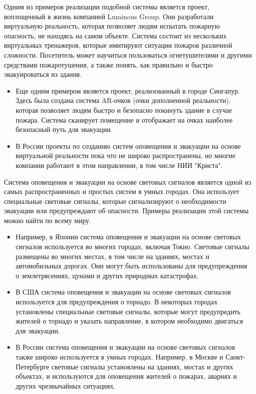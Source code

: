 \begin{multicols}{2}
Одним из примеров реализации подобной системы является проект,
воплощенный в жизнь компанией Luminous Group. Они разработали
виртуальную реальность, которая позволяет людям испытать пожарную
опасность, не находясь на самом объекте. Система состоит из нескольких
виртуальных тренажеров, которые имитируют ситуации пожаров различной
сложности. Посетитель может научиться пользоваться огнетушителями и
другими средствами пожаротушения, а также понять, как правильно и быстро
эвакуироваться из здания.

\begin{itemize}
\item
  Еще одним примером является проект, реализованный в городе Сингапур.
  Здесь была создана система AR-очков (очки дополненной реальности),
  которая позволяет людям быстро и безопасно покинуть здание в случае
  пожара. Система сканирует помещение и отображает на очках наиболее
  безопасный путь для эвакуации.
\item
  В России проекты по созданию систем оповещения и эвакуации на основе
  виртуальной реальности пока что не широко распространены, но многие
  компании работают в этом направлении, в том числе НИИ "Криста".
\end{itemize}

Система оповещения и эвакуации на основе световых сигналов является
одной из самых распространенных и простых систем в умных городах. Она
использует специальные световые сигналы, которые сигнализируют о
необходимости эвакуации или предупреждают об опасности. Примеры
реализации этой системы можно найти по всему миру.

\begin{itemize}
\item
  Например, в Японии система оповещения и эвакуации на основе световых
  сигналов используется во многих городах, включая Токио. Световые
  сигналы размещены во многих местах, в том числе на зданиях, мостах и
  автомобильных дорогах. Они могут быть использованы для предупреждения
  о землетрясениях, цунами и других природных катастрофах.
\item
  В США система оповещения и эвакуации на основе световых сигналов
  используется для предупреждения о торнадо. В некоторых городах
  установлены специальные световые сигналы, которые могут предупредить
  жителей о торнадо и указать направление, в котором необходимо
  двигаться для эвакуации.
\item
  В России система оповещения и эвакуации на основе световых сигналов
  также широко используется в умных городах. Например, в Москве и
  Санкт-Петербурге световые сигналы установлены на зданиях, мостах и
  других объектах, и используются для оповещения жителей о пожарах,
  авариях и других чрезвычайных ситуациях.
\end{itemize}


\end{multicols}
